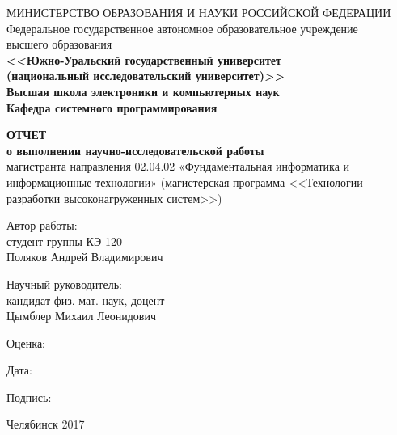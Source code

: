 \begin{titlepage}
	\begin{center}
		МИНИСТЕРСТВО ОБРАЗОВАНИЯ И НАУКИ РОССИЙСКОЙ ФЕДЕРАЦИИ \\
		Федеральное государственное автономное образовательное учреждение \\
		высшего образования \\
		\textbf{<<Южно-Уральский государственный университет \\
			(национальный исследовательский университет)>> \\
			Высшая школа электроники и компьютерных наук \\
			Кафедра системного программирования}
	\end{center}
	
	\vspace{1cm}
	
	\begin{center}\large
		\textbf{ ОТЧЕТ \\о выполнении научно-исследовательской работы} \\
		магистранта направления 02.04.02 «Фундаментальная информатика и информационные технологии» (магистерская программа <<Технологии разработки высоконагруженных систем>>)
	\end{center}
	
	\vfill
	
	\hfill\begin{minipage}{0.4\textwidth}
		Автор работы:\\
		студент группы КЭ-120 \\
		Поляков Андрей Владимирович\\
	\end{minipage}%
	\bigskip
	
	\hfill\begin{minipage}{0.4\textwidth}
		Научный руководитель:\\
		кандидат физ.-мат. наук, доцент\\
		Цымблер Михаил Леонидович\\
	\end{minipage}%
	\bigskip
	
	\hfill\begin{minipage}{0.4\textwidth}
		Оценка: \underline{\hspace{\ML}} 
	\end{minipage}%
	\bigskip
	
	\hfill\begin{minipage}{0.4\textwidth}
		Дата: \underline{\hspace{\ML}} 
	\end{minipage}%
	\bigskip
	
	\hfill\begin{minipage}{0.4\textwidth}
		Подпись: \underline{\hspace{\ML}}
	\end{minipage}%
	\vfill
	
	\begin{center}
		Челябинск 2017
	\end{center}
	
\end{titlepage}